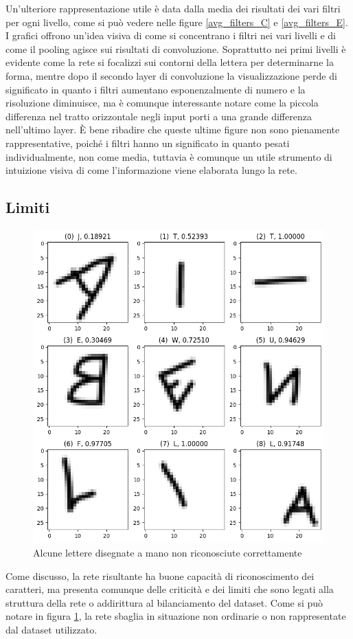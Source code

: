 \documentclass[a4paper,12pt]{article}
\begin{document}
Un'ulteriore rappresentazione utile è data dalla media dei risultati dei vari filtri per ogni livello, come si può vedere nelle figure \ref{avg_filters_C} e \ref{avg_filters_E}. I grafici offrono un'idea visiva di come si concentrano i filtri nei vari livelli e di come il pooling agisce sui risultati di convoluzione.
Soprattutto nei primi livelli è evidente come la rete si focalizzi sui contorni della lettera per determinarne la forma, mentre dopo il secondo layer di convoluzione la visualizzazione perde di significato in quanto i filtri aumentano esponenzalmente di numero e la risoluzione diminuisce, ma è comunque interessante notare come la piccola differenza nel tratto orizzontale negli input porti a una grande differenza nell'ultimo layer.
È bene ribadire che queste ultime figure non sono pienamente rappresentative, poiché i filtri hanno un significato in quanto pesati individualmente, non come media, tuttavia è comunque un utile strumento di intuizione visiva di come l'informazione viene elaborata lungo la rete.

\subsection{Limiti}

\begin{figure}
\centering
\includegraphics[width=.6\linewidth]{images/drawn_letters_wrong_prediction.png}
\caption{Alcune lettere disegnate a mano non riconosciute correttamente}
\label{letters_wrong_prediction}
\end{figure}

Come discusso, la rete risultante ha buone capacità di riconoscimento dei caratteri, ma presenta comunque delle criticità e dei limiti che sono legati alla struttura della rete o addirittura al bilanciamento del dataset.
Come si può notare in figura \ref{letters_wrong_prediction}, la rete sbaglia in situazione non ordinarie o non rappresentate dal dataset utilizzato.
\end{document}

